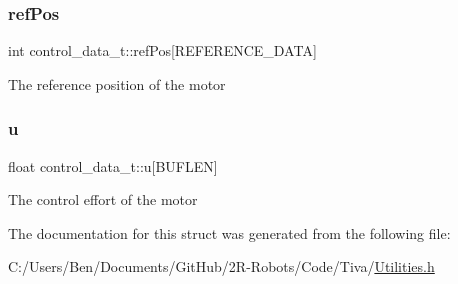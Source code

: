 \subsubsection{\texorpdfstring{ref\+Pos}{refPos}}
{\footnotesize\ttfamily int control\+\_\+data\+\_\+t\+::ref\+Pos\mbox{[}R\+E\+F\+E\+R\+E\+N\+C\+E\+\_\+\+D\+A\+TA\mbox{]}}

The reference position of the motor \mbox{\label{structcontrol__data__t_afaa78dec7226a62a09817e6ac67f8b3a}} 
\subsubsection{\texorpdfstring{u}{u}}
{\footnotesize\ttfamily float control\+\_\+data\+\_\+t\+::u\mbox{[}B\+U\+F\+L\+EN\mbox{]}}

The control effort of the motor 

The documentation for this struct was generated from the following file\+:\begin{DoxyCompactItemize}
\item 
C\+:/\+Users/\+Ben/\+Documents/\+Git\+Hub/2\+R-\/\+Robots/\+Code/\+Tiva/\mbox{\hyperlink{_utilities_8h}{Utilities.\+h}}\end{DoxyCompactItemize}
